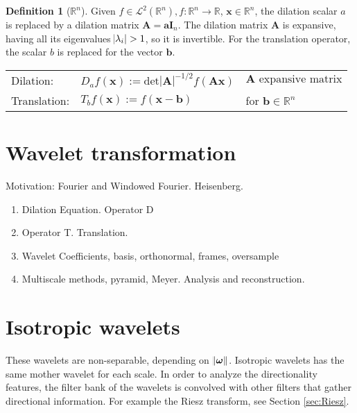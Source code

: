 \documentclass{InsightArticle}
\theoremstyle{definition}
\newtheorem{definition}{Definition}[section]
\begin{document}
\begin{definition}[$\mathbb{R}^n$]
  Given $f \in \mathcal{L}^2(\mathbb{R}^n), f:\mathbb{R}^n \rightarrow \mathbb{R}$, $\bm{x}\in\mathbb{R}^n$, the dilation scalar $a$ is replaced by a dilation matrix $\bm{A} = \bm{a} \bm{I}_n$. The dilation matrix $\bm{A}$ is expansive, having all its eigenvalues $\abs{\lambda_i} > 1$, so it is invertible. For the translation operator, the scalar $b$ is replaced for the vector $\bm{b}$.\\
  \begin{tabular}{lll}
    Dilation:& $D_a f(\bm{x}):=\text{det}|\bm{A}|^{-1/2}f(\bm{A}\bm{x})$ &$\bm{A} \text{ expansive matrix}$\\
    Translation:&   $T_b f(\bm{x}):=f(\bm{x}-\bm{b})$ &for $\bm{b} \in \mathbb{R}^n$ \\
  \end{tabular}
\end{definition}

\section{Wavelet transformation}
Motivation: Fourier and Windowed Fourier. Heisenberg.
\begin{enumerate}
  \item Dilation Equation. Operator D
  \item Operator T. Translation.
  \item Wavelet Coefficients, basis, orthonormal, frames, oversample
  \item Multiscale methods, pyramid, Meyer. Analysis and reconstruction.
\end{enumerate}

\section{Isotropic wavelets}
\label{sub:Isotropic}
These wavelets are non-separable, depending on $\norm{\bm{\omega}}$. Isotropic wavelets has the same mother wavelet for each scale. In order to analyze the directionality features, the filter bank of the wavelets is convolved with other filters that gather directional information. For example the Riesz transform, see Section \ref{sec:Riesz}.
\end{document}
